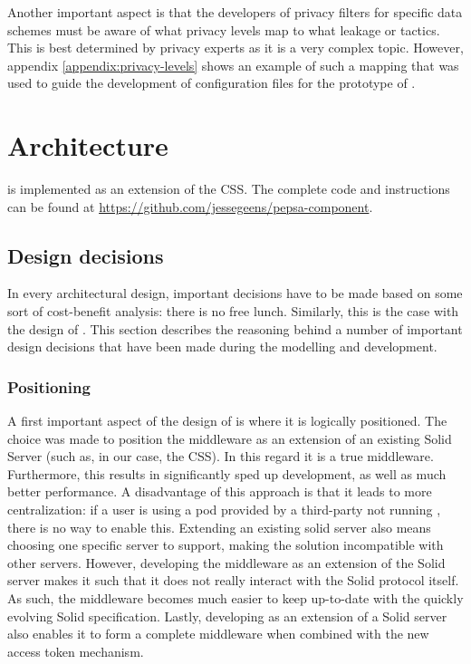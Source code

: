 Another important aspect is that the developers of privacy filters for specific data schemes must be aware of what privacy levels map to what leakage or tactics. This is best determined by privacy experts as it is a very complex topic. However, appendix \ref{appendix:privacy-levels} shows an example of such a mapping that was used to guide the development of configuration files for the prototype of \middleware{}.

\section{Architecture}
\label{sec:implementation}
\middleware{} is implemented as an extension of the \acrlong{CSS}. The complete code and instructions can be found at \url{https://github.com/jessegeens/pepsa-component}.

\subsection{Design decisions}
\label{sec:design-decisions}
In every architectural design, important decisions have to be made based on some sort of cost-benefit analysis: there is no free lunch. Similarly, this is the case with the design of \middleware{}. This section describes the reasoning behind a number of important design decisions that have been made during the modelling and development.

\subsubsection{Positioning}
A first important aspect of the design of \middleware{} is where it is logically positioned. The choice was made to position the middleware as an extension of an existing Solid Server (such as, in our case, the \gls{CSS}). In this regard it is a true middleware. Furthermore, this results in significantly sped up development, as well as much better performance. A disadvantage of this approach is that it leads to more centralization: if a user is using a pod provided by a third-party not running \middleware{}, there is no way to enable this. Extending an existing solid server also means choosing one specific server to support, making the solution incompatible with other servers. However, developing the middleware as an extension of the Solid server makes it such that it does not really interact with the Solid protocol itself. As such, the middleware becomes much easier to keep up-to-date with the quickly evolving Solid specification. Lastly, developing \middleware{} as an extension of a Solid server also enables it to form a complete middleware when combined with the new access token mechanism.

